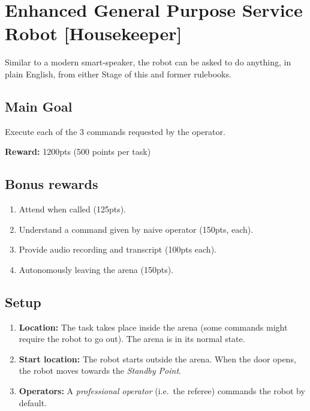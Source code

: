 \section{Enhanced General Purpose Service Robot [Housekeeper]}
\label{test:egpsr}
Similar to a modern smart-speaker, the robot can be asked to do anything, in plain English, from either Stage of this and former rulebooks.


\subsection*{Main Goal}
Execute each of the 3 commands requested by the operator.

\noindent\textbf{Reward:} 1200pts (500 points per task)\\

\subsection*{Bonus rewards}
\begin{enumerate}[nosep]
	\item Attend when called (125pts).
	\item Understand a command given by naive operator (150pts, each).
	\item Provide audio recording and transcript (100pts each).
	\item Autonomously leaving the arena (150pts).
\end{enumerate}

%
%
\subsection*{Setup}
\begin{enumerate}
	\item \textbf{Location:} The task takes place inside the arena (some commands might require the robot to go out). The arena is in its normal state.

	\item \textbf{Start location:} The robot starts outside the arena. When the door opens, the robot moves towards the \textit{Standby Point}.

	\item \textbf{Operators:} A \emph{professional operator} (i.e.~the referee) commands the robot by default.
\end{enumerate}

